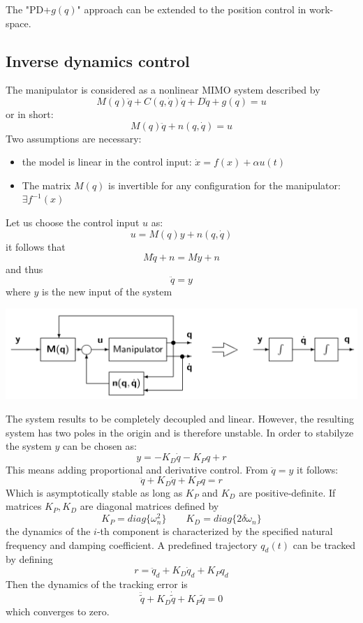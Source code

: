 \documentclass{book}
\begin{document}
The "PD+$g(q)$" approach can be extended to the position control in work-space.





\subsection{Inverse dynamics control}
The manipulator is considered as a nonlinear MIMO system described by 
\[
    M(q)\ddot{q}+C(q,\dot{q})\dot{q}+D\dot{q}+g(q)=u
\]
or in short:
\[
    M(q)\ddot{q}+n(q,\dot{q})=u
\]
Two assumptions are necessary:
\begin{itemize}
    \item the model is linear in the control input: $ \dot{x}=f(x)+\alpha u(t)$
    \item The matrix $M(q)$ is invertible for any configuration for the manipulator: $ \exists f^{-1}(x)$
\end{itemize}
Let us choose the control input $u$ as:
\[
    u=M(q)y + n(q,\dot{q})
\]
it follows that
\[
    M\ddot{q}+n=My+n
\]
and thus
\[
    \ddot{q}=y
\]
where $y$ is the new input of the system

\includegraphics[width=\textwidth]{invkin}

The system results to be completely decoupled and linear. However, the resulting system has two poles in the origin and is therefore unstable. In order to stabilyze the system $y$ can be chosen as:
\[
    y= -K_D\dot{q}-K_Pq+r
\]
This means adding proportional and derivative control. From $\ddot{q}=y$ it follows:
\[
    \ddot{q}+K_D\dot{q}+K_Pq=r
\]
Which is asymptotically stable as long as $K_P$ and $K_D$ are positive-definite. If matrices $K_P,K_D$ are diagonal matrices defined by
\[
    K_P=diag\{\omega_n^2\} \qquad K_D=diag\{2\delta \omega_n\}
\]
the dynamics of the $i$-th component is characterized by the specified natural frequency and damping coefficient. A predefined trajectory $q_d(t)$ can be tracked by defining
\[
    r = \ddot{q}_d+K_D\dot{q}_d+K_Pq_d
\]
Then the dynamics of the tracking error is
\[
    \ddot{\tilde{q}} + K_D\dot{\tilde{q}} + K_P\tilde{q} = 0
\]
which converges to zero.
\end{document}
